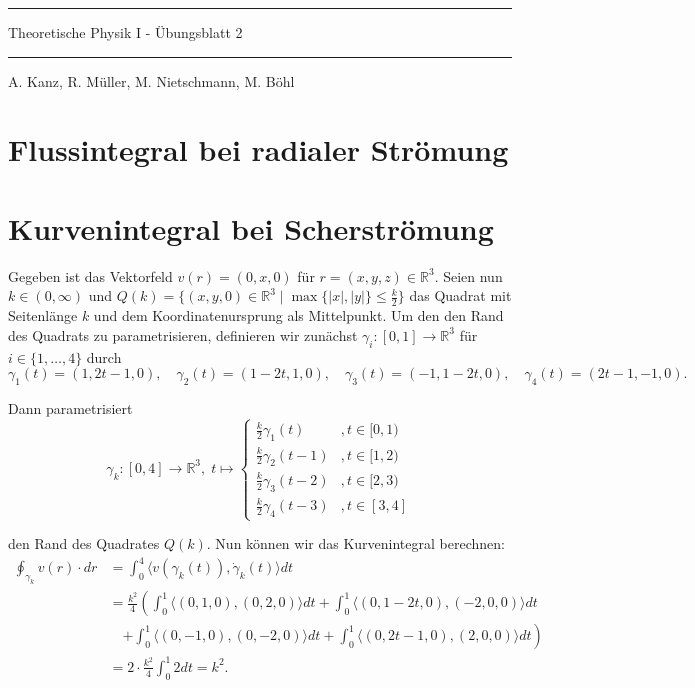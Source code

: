 \documentclass[11pt]{article}
\theoremstyle{plain}
\theoremstyle{definition}
\newcommand{\R}{\mathbb{R}}
\newcommand{\longto}{\longrightarrow}
\begin{document}
\pagestyle{fancy}
\thispagestyle{plain}

\rule{\textwidth}{.5pt}
\begin{center}
\Huge{Theoretische Physik I - Übungsblatt 2}
\end{center}

\rule{\textwidth}{.5pt}
\text{} \hfill A. Kanz, R. Müller, M. Nietschmann, M. Böhl



\section{Flussintegral bei radialer Strömung}


\section{Kurvenintegral bei Scherströmung}
Gegeben ist das Vektorfeld $v(r) = (0, x, 0)$ für $r = (x,y,z) \in \R^3$. Seien nun $k \in (0, \infty)$ und $Q(k) = \{ (x,y,0) \in \R^3 \mid \max \{ |x|,|y| \} \leq \frac{k}{2} \}$ das Quadrat mit Seitenlänge $k$ und dem Koordinatenursprung als Mittelpunkt. Um den den Rand des Quadrats zu parametrisieren, definieren wir zunächst $\gamma_i : [0,1] \longto \R^3$ für $i \in \{1,\dots, 4\}$ durch
\[ \gamma_1 (t) = (1, 2t-1, 0), \quad \gamma_2 (t) = (1-2t, 1, 0), \quad \gamma_3 (t) = (-1, 1-2t, 0), \quad \gamma_4 (t) = (2t-1, -1, 0). \]

Dann parametrisiert
\[ \gamma_k: [0,4] \longto \R^3,\; t \longmapsto \begin{cases}
\tfrac{k}{2}\gamma_1(t) &, t \in [0,1)\\
\tfrac{k}{2}\gamma_2(t-1) &, t \in [1,2)\\
\tfrac{k}{2}\gamma_3(t-2) &, t \in [2,3)\\
\tfrac{k}{2}\gamma_4(t-3) &, t \in [3,4]
\end{cases} \]

den Rand des Quadrates $Q(k)$. Nun können wir das Kurvenintegral berechnen:
\begin{align*}
\oint_{\gamma_k} v(r)\cdot dr &= \int_0^4 \langle v(\gamma_k(t)), \dot \gamma_k (t) \rangle dt \\
&= \frac{k^2}{4} \left( \int_0^1 \langle (0,1,0), (0,2,0) \rangle dt + \int_0^1 \langle (0, 1-2t, 0), (-2,0,0) \rangle dt \right.\\
&\quad \left. + \int_0^1 \langle (0,-1,0), (0,-2,0) \rangle dt + \int_0^1 \langle (0, 2t-1, 0), (2,0,0) \rangle dt \right)\\
&= 2\cdot\frac{k^2}{4} \int_0^1 2 dt = k^2.
\end{align*}
\end{document}
